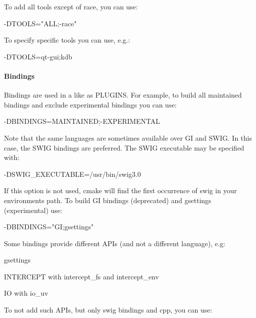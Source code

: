 To add all tools except of race, you can use\+:


\begin{DoxyCode}
-DTOOLS="ALL;-race"
\end{DoxyCode}


To specify specific tools you can use, e.\+g.\+:


\begin{DoxyCode}
-DTOOLS=qt-gui;kdb
\end{DoxyCode}


\paragraph*{Bindings}

Bindings are used in a like as {\ttfamily P\+L\+U\+G\+I\+NS}. For example, to build all maintained bindings and exclude experimental bindings you can use\+:


\begin{DoxyCode}
-DBINDINGS=MAINTAINED;-EXPERIMENTAL
\end{DoxyCode}


Note that the same languages are sometimes available over GI and S\+W\+IG. In this case, the S\+W\+IG bindings are preferred. The S\+W\+IG executable may be specified with\+:


\begin{DoxyCode}
-DSWIG\_EXECUTABLE=/usr/bin/swig3.0
\end{DoxyCode}


If this option is not used, cmake will find the first occurrence of {\ttfamily swig} in your environment\textquotesingle{}s path. To build GI bindings (deprecated) and gsettings (experimental) use\+:


\begin{DoxyCode}
-DBINDINGS="GI;gsettings"
\end{DoxyCode}


Some bindings provide different A\+P\+Is (and not a different language), e.\+g\+:


\begin{DoxyItemize}
\item {\ttfamily gsettings}
\item {\ttfamily I\+N\+T\+E\+R\+C\+E\+PT} with {\ttfamily intercept\+\_\+fs} and {\ttfamily intercept\+\_\+env}
\item {\ttfamily IO} with {\ttfamily io\+\_\+uv}
\end{DoxyItemize}

To not add such A\+P\+Is, but only {\ttfamily swig} bindings and {\ttfamily cpp}, you can use\+:


